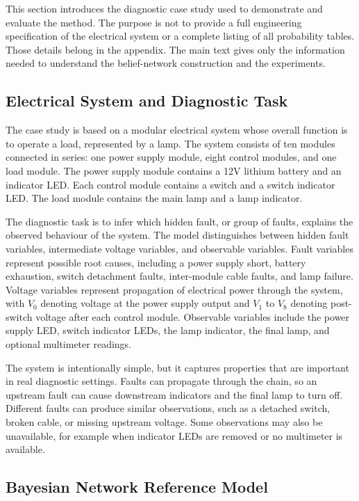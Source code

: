 \documentclass[runningheads]{llncs}
\begin{document}
This section introduces the diagnostic case study used to demonstrate and evaluate the method. The purpose is not to provide a full engineering specification of the electrical system or a complete listing of all probability tables. Those details belong in the appendix. The main text gives only the information needed to understand the belief-network construction and the experiments.

\subsection{Electrical System and Diagnostic Task}
\label{sec:electrical_system_diagnostic_task}

The case study is based on a modular electrical system whose overall function is to operate a load, represented by a lamp. The system consists of ten modules connected in series: one power supply module, eight control modules, and one load module. The power supply module contains a 12V lithium battery and an indicator LED. Each control module contains a switch and a switch indicator LED. The load module contains the main lamp and a lamp indicator.

The diagnostic task is to infer which hidden fault, or group of faults, explains the observed behaviour of the system. The model distinguishes between hidden fault variables, intermediate voltage variables, and observable variables. Fault variables represent possible root causes, including a power supply short, battery exhaustion, switch detachment faults, inter-module cable faults, and lamp failure. Voltage variables represent propagation of electrical power through the system, with $V_0$ denoting voltage at the power supply output and $V_1$ to $V_8$ denoting post-switch voltage after each control module. Observable variables include the power supply LED, switch indicator LEDs, the lamp indicator, the final lamp, and optional multimeter readings.

The system is intentionally simple, but it captures properties that are important in real diagnostic settings. Faults can propagate through the chain, so an upstream fault can cause downstream indicators and the final lamp to turn off. Different faults can produce similar observations, such as a detached switch, broken cable, or missing upstream voltage. Some observations may also be unavailable, for example when indicator LEDs are removed or no multimeter is available.



\subsection{Bayesian Network Reference Model}
\label{sec:bn_reference_model}
\end{document}

